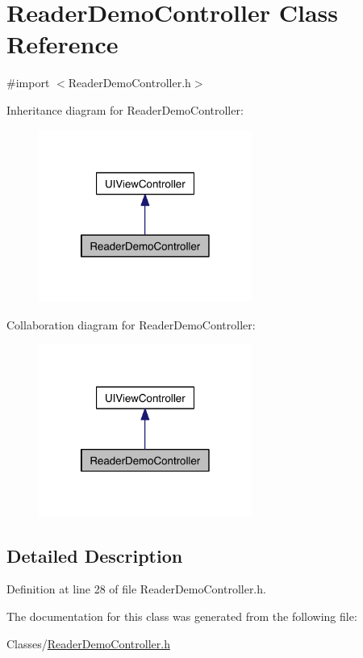 \hypertarget{interface_reader_demo_controller}{\section{Reader\-Demo\-Controller Class Reference}
\label{d7/de5/interface_reader_demo_controller}
}


{\ttfamily \#import $<$Reader\-Demo\-Controller.\-h$>$}



Inheritance diagram for Reader\-Demo\-Controller\-:
\nopagebreak
\begin{figure}[H]
\begin{center}
\leavevmode
\includegraphics[width=198pt]{d5/d40/interface_reader_demo_controller__inherit__graph}
\end{center}
\end{figure}


Collaboration diagram for Reader\-Demo\-Controller\-:
\nopagebreak
\begin{figure}[H]
\begin{center}
\leavevmode
\includegraphics[width=198pt]{da/d44/interface_reader_demo_controller__coll__graph}
\end{center}
\end{figure}


\subsection{Detailed Description}


Definition at line 28 of file Reader\-Demo\-Controller.\-h.



The documentation for this class was generated from the following file\-:\begin{DoxyCompactItemize}
\item 
Classes/\hyperlink{_reader_demo_controller_8h}{Reader\-Demo\-Controller.\-h}\end{DoxyCompactItemize}
